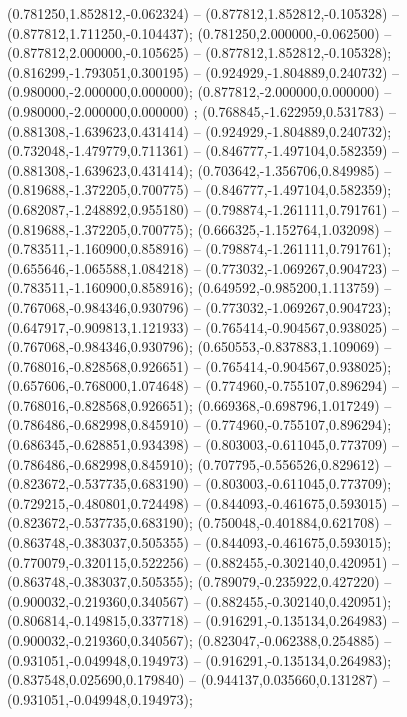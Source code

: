  (0.781250,1.852812,-0.062324) -- (0.877812,1.852812,-0.105328) -- (0.877812,1.711250,-0.104437);
 (0.781250,2.000000,-0.062500) -- (0.877812,2.000000,-0.105625) -- (0.877812,1.852812,-0.105328);
 (0.816299,-1.793051,0.300195) -- (0.924929,-1.804889,0.240732) -- (0.980000,-2.000000,0.000000);
 (0.877812,-2.000000,0.000000) -- (0.980000,-2.000000,0.000000) ;
 (0.768845,-1.622959,0.531783) -- (0.881308,-1.639623,0.431414) -- (0.924929,-1.804889,0.240732);
 (0.732048,-1.479779,0.711361) -- (0.846777,-1.497104,0.582359) -- (0.881308,-1.639623,0.431414);
 (0.703642,-1.356706,0.849985) -- (0.819688,-1.372205,0.700775) -- (0.846777,-1.497104,0.582359);
 (0.682087,-1.248892,0.955180) -- (0.798874,-1.261111,0.791761) -- (0.819688,-1.372205,0.700775);
 (0.666325,-1.152764,1.032098) -- (0.783511,-1.160900,0.858916) -- (0.798874,-1.261111,0.791761);
 (0.655646,-1.065588,1.084218) -- (0.773032,-1.069267,0.904723) -- (0.783511,-1.160900,0.858916);
 (0.649592,-0.985200,1.113759) -- (0.767068,-0.984346,0.930796) -- (0.773032,-1.069267,0.904723);
 (0.647917,-0.909813,1.121933) -- (0.765414,-0.904567,0.938025) -- (0.767068,-0.984346,0.930796);
 (0.650553,-0.837883,1.109069) -- (0.768016,-0.828568,0.926651) -- (0.765414,-0.904567,0.938025);
 (0.657606,-0.768000,1.074648) -- (0.774960,-0.755107,0.896294) -- (0.768016,-0.828568,0.926651);
 (0.669368,-0.698796,1.017249) -- (0.786486,-0.682998,0.845910) -- (0.774960,-0.755107,0.896294);
 (0.686345,-0.628851,0.934398) -- (0.803003,-0.611045,0.773709) -- (0.786486,-0.682998,0.845910);
 (0.707795,-0.556526,0.829612) -- (0.823672,-0.537735,0.683190) -- (0.803003,-0.611045,0.773709);
 (0.729215,-0.480801,0.724498) -- (0.844093,-0.461675,0.593015) -- (0.823672,-0.537735,0.683190);
 (0.750048,-0.401884,0.621708) -- (0.863748,-0.383037,0.505355) -- (0.844093,-0.461675,0.593015);
 (0.770079,-0.320115,0.522256) -- (0.882455,-0.302140,0.420951) -- (0.863748,-0.383037,0.505355);
 (0.789079,-0.235922,0.427220) -- (0.900032,-0.219360,0.340567) -- (0.882455,-0.302140,0.420951);
 (0.806814,-0.149815,0.337718) -- (0.916291,-0.135134,0.264983) -- (0.900032,-0.219360,0.340567);
 (0.823047,-0.062388,0.254885) -- (0.931051,-0.049948,0.194973) -- (0.916291,-0.135134,0.264983);
 (0.837548,0.025690,0.179840) -- (0.944137,0.035660,0.131287) -- (0.931051,-0.049948,0.194973);
